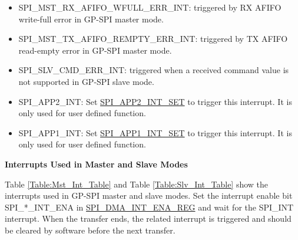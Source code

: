 \documentclass[main\_\_EN.tex]{subfiles}
\begin{document}
\begin{itemize}
\item \label{int:SPIMSTRXAFIFOWFULLERRINT}
SPI\_MST\_RX\_AFIFO\_WFULL\_ERR\_INT: triggered by RX AFIFO write-full error in GP-SPI master mode.

\item \label{int:SPIMSTTXAFIFOREMPTYERRINT}
SPI\_MST\_TX\_AFIFO\_REMPTY\_ERR\_INT: triggered by TX AFIFO read-empty error in GP-SPI master mode.

\item \label{int:SPISLVCMDERRINT} SPI\_SLV\_CMD\_ERR\_INT: triggered when a received command value is not supported in GP-SPI slave mode.

\item \label{int:SPIAPP2INT}SPI\_APP2\_INT: Set \hyperref[fielddesc:SPIAPP2INTSET]{SPI\_APP2\_INT\_SET} to trigger this interrupt. It is only used for user defined function. 
\item \label{int:SPIAPP1INT}SPI\_APP1\_INT: Set \hyperref[fielddesc:SPIAPP1INTSET]{SPI\_APP1\_INT\_SET} to trigger this interrupt. It is only used for user defined function.

\end{itemize}

\textbf{Interrupts Used in Master and Slave Modes}

Table \ref{Table:Mst_Int_Table} and Table \ref{Table:Slv_Int_Table} show the interrupts used in GP-SPI master and slave modes. Set the interrupt enable bit SPI\_*\_INT\_ENA in \hyperref[regdesc:SPIDMAINTENAREG]{SPI\_DMA\_INT\_ENA\_REG} and wait for the SPI\_INT interrupt. When the transfer ends, the related interrupt is triggered and should be cleared by software before the next transfer.
\end{document}
